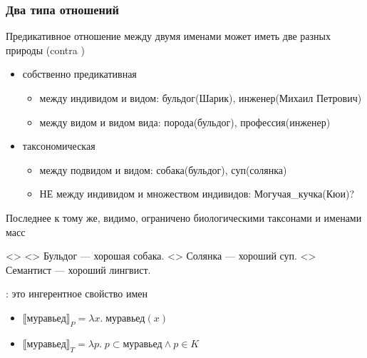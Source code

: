 \documentclass[
    9pt,
]{beamer}
\newcommand{\denote}[1]{\llbracket #1 \rrbracket}
\begin{document}
\begin{frame}
    \frametitle{Два типа отношений}

    Предикативное отношение между двумя именами может иметь две разных природы (contra \textcite{dayal2004numbermarkingdefiniteness})

    \begin{itemize}
        \item собственно предикативная
        \begin{itemize}
            \item между индивидом и видом: бульдог(Шарик), инженер(Михаил Петрович)
            \item между видом и видом вида: порода(бульдог), профессия(инженер)
        \end{itemize}
        \item таксономическая
        \begin{itemize}
            \item между подвидом и видом: собака(бульдог), суп(солянка)
            \item НЕ между индивидом и множеством индивидов: Могучая\_кучка(Кюи)?
        \end{itemize}
    \end{itemize}

    Последнее к тому же, видимо, ограничено биологическими таксонами и именами масс

    \pex<>
        \a<> Бульдог — хорошая собака.
        \a<> Солянка — хороший суп.
        \a<> \ljudge* Семантист — хороший лингвист.
    \xe

    \textcite[и мн. др.]{krifka1995genericityintroduction}: это ингерентное свойство имен
    \begin{itemize}
        \item $\denote{\text{муравьед}}_P = \lambda x.\; \text{муравьед}(x)$
        \item $\denote{\text{муравьед}}_T = \lambda p.\; p\subset \text{муравьед} \land p\in K$
    \end{itemize}

\end{frame}
\end{document}
